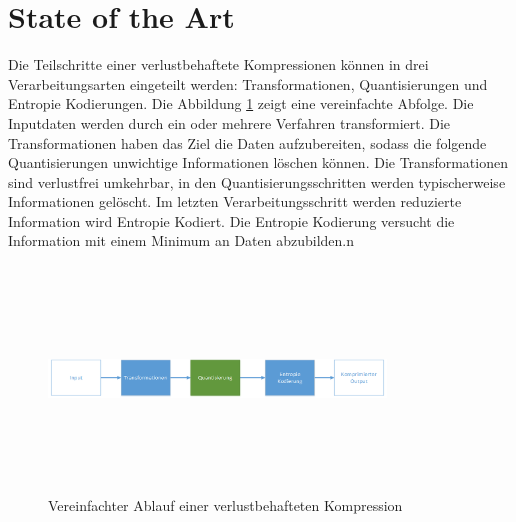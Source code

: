 \section{State of the Art}
Die Teilschritte einer verlustbehaftete Kompressionen können in drei Verarbeitungsarten eingeteilt werden: Transformationen, Quantisierungen und Entropie Kodierungen. Die Abbildung \ref{state:aufbau} zeigt eine vereinfachte Abfolge. Die Inputdaten werden durch ein oder mehrere Verfahren transformiert. Die Transformationen haben das Ziel die Daten aufzubereiten, sodass die folgende Quantisierungen unwichtige Informationen löschen können. Die Transformationen sind  verlustfrei umkehrbar, in den Quantisierungsschritten werden typischerweise Informationen gelöscht. Im letzten Verarbeitungsschritt werden reduzierte Information wird Entropie Kodiert. Die Entropie Kodierung versucht die Information mit einem Minimum an Daten abzubilden.n\\
\begin{figure}[!htbp]
	\center
	\includegraphics[width=0.8\textwidth,height=6cm,keepaspectratio]{./pictures/state/aufbau.png}
	\caption{Vereinfachter Ablauf einer verlustbehafteten Kompression}
	\label{state:aufbau}
\end{figure}

